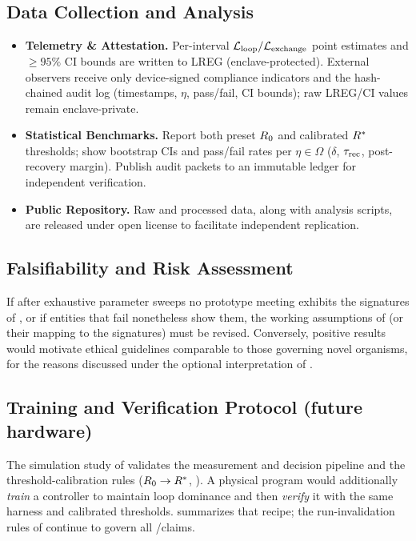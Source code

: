 \documentclass[11pt]{article}
\begin{document}
\subsection{Data Collection and Analysis}
\label{sec:data_collection}

\begin{itemize}
\item \textbf{Telemetry \& Attestation.} Per-interval $\mathcal{L}_{\text{loop}}/\mathcal{L}_{\text{exchange}}$ point estimates and $\geq 95\%$ CI bounds are written to LREG (enclave-protected). External observers receive only device-signed compliance indicators and the hash-chained audit log (timestamps, $\eta$, pass/fail, CI bounds); raw LREG/CI values remain enclave-private.
\item \textbf{Statistical Benchmarks.} Report both preset $R_0$ and calibrated $R^*$ thresholds; show bootstrap CIs and pass/fail rates per $\eta \in \Omega$ ($\delta$, $\tau_{\text{rec}}$, post-recovery margin). Publish audit packets to an immutable ledger for independent verification.
\item \textbf{Public Repository.} Raw and processed data, along with analysis scripts, are released under open license to facilitate independent replication.
\end{itemize}

\subsection{Falsifiability and Risk Assessment}
\label{sec:falsifiability}

If after exhaustive parameter sweeps no prototype meeting \NC exhibits the signatures of , or if entities that fail \NC nonetheless show them, the working assumptions of  (or their mapping to the signatures) must be revised. Conversely, positive results would motivate ethical guidelines comparable to those governing novel organisms, for the reasons discussed under the optional interpretation of .

\subsection{Training and Verification Protocol (future hardware)}
\label{sec:training_protocol}

The simulation study of  validates the measurement and decision pipeline and the threshold-calibration rules ($R_0 \rightarrow R^*$, ). A physical program would additionally \emph{train} a controller to maintain loop dominance and then \emph{verify} it with the same harness and calibrated thresholds.  summarizes that recipe; the run-invalidation rules of  continue to govern all \NC/\SC claims.
\end{document}
